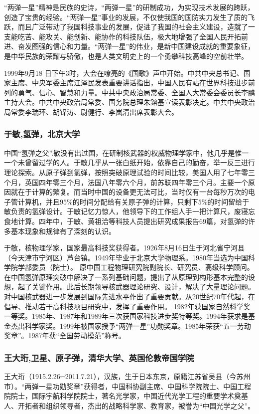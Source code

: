 \documentclass[UTF8]{ctexart}
\begin{document}
    “两弹一星”精神是民族的史诗，“两弹一星”的研制成功，为实现技术发展的跨跃，创造了宝贵的经验。“两弹一星”事业的发展，不仅使我国的国防实力发生了质的飞跃，而且广泛带动了我国科技事业的发展，促进了我国的社会主义建设，造就了一支能吃苦、能攻关、能创新、能协作的科技队伍，极大地增强了全国人民开拓前进、奋发图强的信心和力量。“两弹一星”的伟业，是新中国建设成就的重要象征，是中华民族的荣耀与骄傲，也是人类文明史上的一个勇攀科技高峰的空前壮举。

    1999年9月18 日下午3时，大会在嘹亮的《国歌》声中开始。中共中央总书记、国家主席、中央军委主席江泽民发表重要讲话指出，中国人民有站在世界科技进步前列的勇气、信心、智慧和力量。中共中央政治局常委、全国人大常委会委员长李鹏主持大会。中共中央政治局常委、国务院总理朱鎔基宣读表彰决定。中共中央政治局常委李瑞环、胡锦涛、尉健行、李岚清出席表彰大会。

    \subsubsection{于敏,氢弹，北京大学}
    中国“氢弹之父”.敏没有出过国，在研制核武器的权威物理学家中，他几乎是惟一一个未曾留过学的人。于敏几乎从一张白纸开始，依靠自己的勤奋，举一反三进行理论探索。从原子弹到氢弹，按照突破原理试验的时间比较，美国人用了七年零三个月，英国四年零三个月，法国八年零六个月，前苏联四年零三个月。主要一个原因就在于计算的繁复。而当时中国的设备更无法可比，当时仅有一台每秒万次的电子管计算机，并且$95\%$的时间分配给有关原子弹的计算，只剩下$5\%$的时间留给于敏负责的氢弹设计。于敏记忆力惊人，他领导下的工作组人手一把计算尺，废寝忘食地计算。四年中，于敏、黄祖洽等科技人员提出研究成果报告69篇，对氢弹的许多基本现象和规律有了深刻的认识。

于敏，核物理学家，国家最高科技奖获得者。1926年8月16日生于河北省宁河县（今天津市宁河区）芦台镇。1949年毕业于北京大学物理系。1980年当选为中国科学院学部委员（院士）。 原中国工程物理研究院副院长、研究员、高级科学顾问。在中国氢弹原理突破中解决了一系列基础问题，提出了从原理到构形基本完整的设想，起了关键作用。此后长期领导核武器理论研究、设计，解决了大量理论问题。对中国核武器进一步发展到国际先进水平作出了重要贡献。从20世纪70年代起，在倡导、推动若干高科技项目研究中，发挥了重要作用。 1982年获国家自然科学奖一等奖。1985年、1987年和1989年三次获国家科技进步奖特等奖。1994年获求是基金杰出科学家奖。1999年被国家授予“两弹一星”功勋奖章。1985年荣获“五一劳动奖章”。1987年获“全国劳动模范”称号。

    \subsubsection{王大珩,卫星、原子弹，清华大学、英国伦敦帝国学院}
王大珩（1915.2.26─2011.7.21），汉族，生于日本东京，原籍江苏省吴县（今苏州市）。“两弹一星功勋奖章”获得者，中国科协副主席、中国科学院院士、中国工程院院士，国际宇航科学院院士，著名光学家，中国近代光学工程的重要学术奠基人、开拓者和组织领导者，杰出的战略科学家、教育家，被誉为“中国光学之父”。
\end{document}
